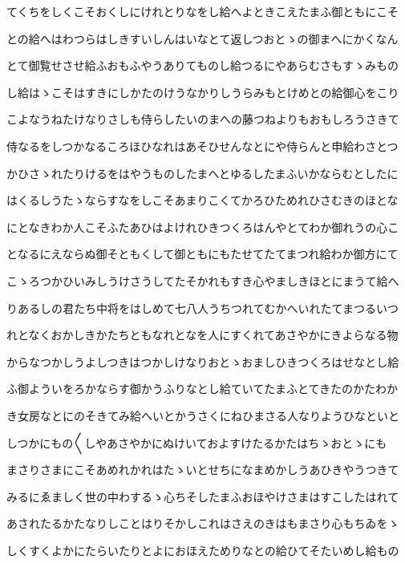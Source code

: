 \documentclass[a4paper,11pt,landscape]{ltjtarticle}
\begin{document}
てくちをしくこそおくしにけれとりなをし給へよときこえたまふ御ともにこそ
\par\medskip
との給へはわつらはしきすいしんはいなとて返しつおとゝの御まへにかくなん
\par\medskip
とて御覧せさせ給ふおもふやうありてものし給つるにやあらむさもすゝみもの
\par\medskip
し給はゝこそはすきにしかたのけうなかりしうらみもとけめとの給御心をこり
\par\medskip
こよなうねたけなりさしも侍らしたいのまへの藤つねよりもおもしろうさきて
\par\medskip
侍なるをしつかなるころほひなれはあそひせんなとにや侍らんと申給わさとつ
\par\medskip
かひさゝれたりけるをはやうものしたまへとゆるしたまふいかならむとしたに
\par\medskip
はくるしうたゝならすなをしこそあまりこくてかろひためれひさむきのほとな
\par\medskip
にとなきわか人こそふたあひはよけれひきつくろはんやとてわか御れうの心こ
\par\medskip
となるにえならぬ御そともくして御ともにもたせてたてまつれ給わか御方にて
\par\medskip
こゝろつかひいみしうけさうしてたそかれもすき心やましきほとにまうて給へ
\par\medskip
りあるしの君たち中将をはしめて七八人うちつれてむかへいれたてまつるいつ
\par\medskip
れとなくおかしきかたちともなれとなを人にすくれてあさやかにきよらなる物
\par\medskip
からなつかしうよしつきはつかしけなりおとゝおましひきつくろはせなとし給
\par\medskip
ふ御よういをろかならす御かうふりなとし給ていてたまふとてきたのかたわか
\par\medskip
き女房なとにのそきてみ給へいとかうさくにねひまさる人なりようひなといと
\par\medskip
しつかにもの〱しやあさやかにぬけいておよすけたるかたはちゝおとゝにも
\par\medskip
まさりさまにこそあめれかれはたゝいとせちになまめかしうあひきやうつきて
\par\medskip
みるにゑましく世の中わするゝ心ちそしたまふおほやけさまはすこしたはれて
\par\medskip
あされたるかたなりしことはりそかしこれはさえのきはもまさり心もちゐをゝ
\par\medskip
しくすくよかにたらいたりとよにおほえためりなとの給ひてそたいめし給もの
\par\medskip
\end{document}
